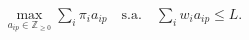 \documentclass[preview]{standalone}
\begin{document}
\begin{align*}
\max_{a_{ip}\in\mathbb{Z}_{\ge 0}} \sum_i \pi_i a_{ip} \quad \text{s.a.}\quad \sum_i w_i a_{ip} \le L.
\end{align*}
\end{document}
